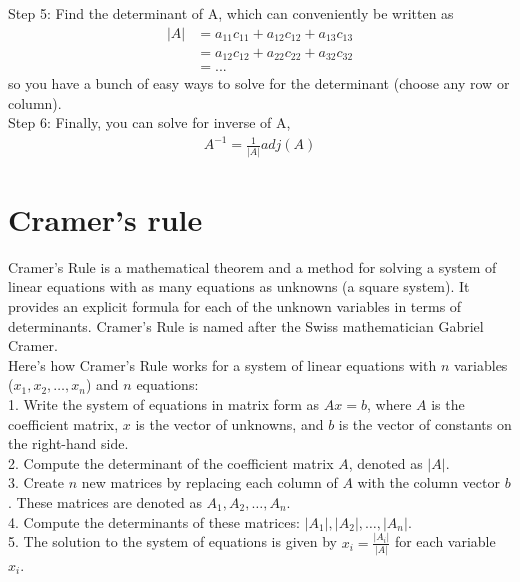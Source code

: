 \documentclass{article}
\begin{document}
Step 5: Find the determinant of A, which can conveniently be written as 
\begin{align}
    |A| &= a_{11}c_{11} + a_{12} c_{12} + a_{13} c_{13}\\
        &= a_{12}c_{12} + a_{22} c_{22} + a_{32} c_{32} \\
        &= ...
\end{align}
so you have a bunch of easy ways to solve for the determinant (choose any row or column). \\

Step 6: Finally, you can solve for inverse of A, 
\begin{align}
    A^{-1} = \frac{1}{|A|}adj(A)
\end{align}

\section{Cramer's rule}

Cramer's Rule is a mathematical theorem and a method for solving a system of linear equations with as many equations as unknowns (a square system). It provides an explicit formula for each of the unknown variables in terms of determinants. Cramer's Rule is named after the Swiss mathematician Gabriel Cramer.\\

Here's how Cramer's Rule works for a system of linear equations with $n$ variables ($x_1, x_2, \ldots, x_n$) and $n$ equations:\\

1. Write the system of equations in matrix form as $Ax = b$, where $A$ is the coefficient matrix, $x$ is the vector of unknowns, and $b$ is the vector of constants on the right-hand side.\\

2. Compute the determinant of the coefficient matrix $A$, denoted as $|A|$.\\

3. Create $n$ new matrices by replacing each column of $A$ with the column vector $b$. These matrices are denoted as $A_1, A_2, \ldots, A_n$.\\

4. Compute the determinants of these matrices: $|A_1|, |A_2|, \ldots, |A_n|$.\\

5. The solution to the system of equations is given by $x_i = \frac{|A_i|}{|A|}$ for each variable $x_i$.\\
\end{document}

